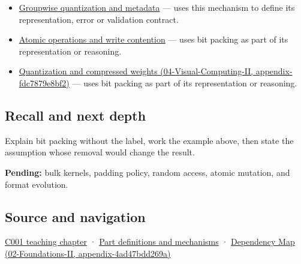 \begin{itemize}
\item
  \hyperref[appendix-638204c40e8b]{Groupwise quantization and metadata} --- uses this mechanism to define its representation, error or validation contract.
\item
  \hyperref[appendix-e12d1b03fefb]{Atomic operations and write contention} --- uses bit packing as part of its representation or reasoning.
\item
  \href{../04-Visual-Computing-II/main.pdf\#nameddest=appendix-fdc7879e8bf2}{Quantization and compressed weights (04-Visual-Computing-II, appendix-fdc7879e8bf2)} --- uses bit packing as part of its representation or reasoning.
\end{itemize}

\subsection{Recall and next depth}\label{appendix-1f9963e1a5d1-recall-and-next-depth}

Explain bit packing without the label, work the example above, then state the assumption whose removal would change the result.

\textbf{Pending:} bulk kernels, padding policy, random access, atomic mutation, and format evolution.

\subsection{Source and navigation}\label{appendix-1f9963e1a5d1-source-and-navigation}

\hyperref[01-foundations-i-ch001-from-a-signal-to-an-interpretation]{C001 teaching chapter} · \hyperref[appendix-fd090d982a15]{Part definitions and mechanisms} · \href{../02-Foundations-II/main.pdf\#nameddest=appendix-4ad47bdd269a}{Dependency Map (02-Foundations-II, appendix-4ad47bdd269a)}
